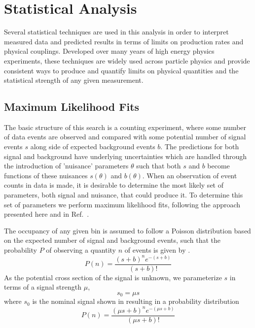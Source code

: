 \chapter{Statistical Analysis}
\label{analysis_chapter}
Several statistical techniques are used in this analysis in order to interpret measured data and predicted results in terms of limits on production rates and physical couplings.
Developed over many years of high energy physics experiments, these techniques are widely used across particle physics and provide consistent ways to produce and quantify limits on physical quantities and the statistical strength of any given measurement.

\section{Maximum Likelihood Fits}
The basic structure of this search is a counting experiment, where some number of data events are observed and compared with some potential number of signal events $s$ along side of expected background events $b$. 
The predictions for both signal and background have underlying uncertainties which are handled through the introduction of 'nuisance' parameters $\theta$ such that both $s$ and $b$ become functions of these nuisances $s(\theta)$ and $b(\theta)$.
When an observation of event counts in data is made, it is desirable to determine the most likely set of parameters, both signal and nuisance, that could produce it. 
To determine this set of parameters we perform maximum likelihood fits, following the approach presented here and in Ref.~\cite{conway2011}. 

The occupancy of any given bin is assumed to follow a Poisson distribution based on the expected number of signal and background events, such that the probability $P$ of observing a quantity $n$ of events is given by .
\begin{equation}
	\label{eq:poisProb}
	P(n) = \frac{(s+b)^{n}e^{-(s+b)}}{(s+b)!}
\end{equation}
As the potential cross section of the signal is unknown, we parameterize $s$ in terms of a signal strength $\mu$,
\begin{equation}
	s_0 = \mu s
\end{equation}
where $s_0$ is the nominal signal shown in  resulting in a probability distribution
\begin{equation}
	P(n) = \frac{(\mu s+b)^{n}e^{-(\mu s+b)}}{(\mu s+b)!}
\end{equation}


